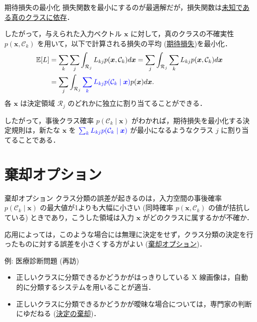 \documentclass[uplatex,11pt,dvipdfmx,aspectratio=169,unicode,t]{beamer}
\numberwithin{equation}{section}
\newcommand{\BE}{\mathbb{E}}
\newcommand{\CC}{\mathcal{C}}
\newcommand{\CR}{\mathcal{R}}
\newcommand{\bs}[1]{\boldsymbol{#1}}
\newcommand{\1}{\bs{1}}
\newcommand{\0}{\bs{0}}
\begin{document}
\begin{frame}{期待損失の最小化}
    損失関数を最小にするのが最適解だが，損失関数は\underline{未知である真のクラスに依存}．

    したがって，与えられた入力ベクトル $\bs{x}$ に対して，真のクラスの不確実性 $p(\bs{x},\CC_{k})$ を用いて，以下で計算される損失の平均 (\underline{期待損失})を最小化．
    \begin{align}
        \begin{aligned}
            \BE[L] &= \sum_{k} \sum_{j} \int_{\CR_{j}} L_{kj} p(\bs{x},\CC_{k}) d{\bs{x}} = \sum_{j} \int_{\CR_{j}} \sum_{k} L_{kj} p(\bs{x},\CC_{k}) d{\bs{x}} \\
            &= \sum_{j} \int_{\CR_{j}} \textcolor{blue}{\sum_{k} L_{kj} p(\CC_{k} \mid \bs{x})} p(\bs{x}) d{\bs{x}}.
        \end{aligned}
    \end{align}
    各 $\bs{x}$ は決定領域 $\CR_{j}$ のどれかに独立に割り当てることができる．
    
    したがって，事後クラス確率 $p(\CC_{k} \mid \bs{x})$ がわかれば，期待損失を最小化する決定規則は，新たな $\bs{x}$ を $\textcolor{blue}{\sum_{k} L_{kj} p(\CC_{k} \mid \bs{x})}$ が最小になるようなクラス $j$ に割り当てることである．
\end{frame}

\section{棄却オプション}

\begin{frame}{棄却オプション}
    クラス分類の誤差が起きるのは，入力空間の事後確率 $p(\CC_{k} \mid \bs{x})$ の最大値が1よりも大幅に小さい (同時確率 $p(\bs{x},\CC_{k})$ の値が拮抗している) ときであり，こうした領域は入力 $\bs{x}$ がどのクラスに属するかが不確か．

    応用によっては，このような場合には無理に決定をせず，クラス分類の決定を行ったものに対する誤差を小さくする方がよい (\underline{棄却オプション})．
    \begin{block}{例: 医療診断問題 (再訪)}
        \begin{itemize}
            \item 正しいクラスに分類できるかどうかがはっきりしている X 線画像は，自動的に分類するシステムを用いることが適当．
            \item 正しいクラスに分類できるかどうかが曖昧な場合については，専門家の判断にゆだねる (\underline{決定の棄却})．
        \end{itemize}
    \end{block}
\end{frame}
\end{document}
